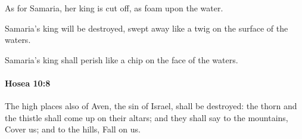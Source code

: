 			\begin{versebox}
					\item[BHS] 
					\item[LXX] 
					\item[ASV] As for Samaria, her king is cut off, as foam upon the water.
					\item[NIV] Samaria’s king will be destroyed, swept away like a twig on the surface of the waters.
					\item[NRSV] Samaria’s king shall perish like a chip on the face of the waters.
			\end{versebox}

		\paragraph{Hosea 10:8} %
			\label{HOSEA-10-8}

			The high places also of Aven, the sin of Israel, shall be destroyed: the thorn and the thistle shall come up on their altars; and they shall say to the mountains, Cover us; and to the hills, Fall on us.

